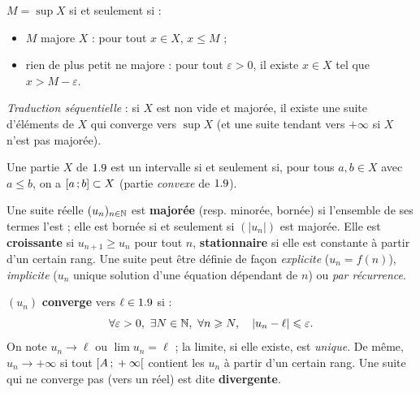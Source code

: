 \begin{savoirfaire}
$M=\sup X$ si et seulement si :
\begin{itemize}[label={\color{otGreenDark}\textbullet},leftmargin=1.4em,itemsep=0.6mm,topsep=0.5mm]
  \item $M$ majore $X$ : pour tout $x\in X$, $x\leq M$ ;
  \item rien de plus petit ne majore : pour tout $\varepsilon>0$, il existe
    $x\in X$ tel que $x>M-\varepsilon$.
\end{itemize}
\emph{Traduction séquentielle} : si $X$ est non vide et majorée, il existe une
suite d'éléments de $X$ qui converge vers $\sup X$ (et une suite tendant vers
$+\infty$ si $X$ n'est pas majorée).
\end{savoirfaire}

\begin{propriete}
Une partie $X$ de $1.9$ est un intervalle si et seulement si, pour tous
$a,b\in X$ avec $a\leq b$, on a $\mathopen{[}a\,{;}\,b\mathclose{]}\subset X$ (partie
\emph{convexe} de $1.9$).
\end{propriete}


\begin{definition}
Une suite réelle $(u_n)_{n\in\mathbb{N}}$ est \textbf{majorée} (resp. minorée,
bornée) si l'ensemble de ses termes l'est ; elle est bornée si et seulement
si $(|u_n|)$ est majorée. Elle est \textbf{croissante} si
$u_{n+1}\geq u_n$ pour tout $n$, \textbf{stationnaire} si elle est constante
à partir d'un certain rang. Une suite peut être définie de façon
\emph{explicite} ($u_n=f(n)$), \emph{implicite} ($u_n$ unique solution d'une
équation dépendant de $n$) ou \emph{par récurrence}.
\end{definition}


\begin{definition}
$(u_n)$ \textbf{converge} vers $\ell\in1.9$ si :
\[
  \forall\varepsilon>0,\ \exists N\in\N,\ \forall n\geq N,\quad|u_n-\ell|\leq\varepsilon.
\]
On note $u_n\longrightarrow\ell$ ou $\lim u_n=\ell$ ; la limite, si elle
existe, est \emph{unique}. De même, $u_n\to+\infty$ si tout
$\mathopen{[}A\,{;}\,+\infty\mathclose{[}$ contient les $u_n$ à partir d'un certain rang. Une
suite qui ne converge pas (vers un réel) est dite \textbf{divergente}.
\end{definition}


